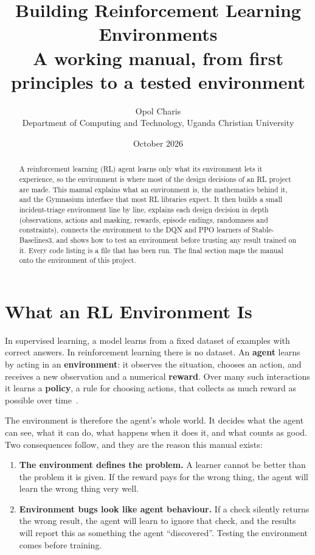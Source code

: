 \documentclass[11pt,a4paper]{article}
\title{\textbf{Building Reinforcement Learning Environments}\\[2pt]\large A working manual, from first principles to a tested environment}
\author{Opol Charis\\\small Department of Computing and Technology, Uganda Christian University}
\date{October 2026}
\begin{document}
\maketitle
\vspace{-6pt}

\begin{abstract}
\noindent A reinforcement learning (RL) agent learns only what its environment lets it experience, so the environment is where most of the design decisions of an RL project are made. This manual explains what an environment is, the mathematics behind it, and the Gymnasium interface that most RL libraries expect. It then builds a small incident-triage environment line by line, explains each design decision in depth (observations, actions and masking, rewards, episode endings, randomness and constraints), connects the environment to the DQN and PPO learners of Stable-Baselines3, and shows how to test an environment before trusting any result trained on it. Every code listing is a file that has been run. The final section maps the manual onto the environment of this project.
\end{abstract}

\tableofcontents
\vspace{4pt}

\section{What an RL Environment Is}

In supervised learning, a model learns from a fixed dataset of examples with correct answers. In reinforcement learning there is no dataset. An \textbf{agent} learns by acting in an \textbf{environment}: it observes the situation, chooses an action, and receives a new observation and a numerical \textbf{reward}. Over many such interactions it learns a \textbf{policy}, a rule for choosing actions, that collects as much reward as possible over time~\cite{sutton}.

The environment is therefore the agent's whole world. It decides what the agent can see, what it can do, what happens when it does it, and what counts as good. Two consequences follow, and they are the reason this manual exists:
\begin{enumerate}
  \item \textbf{The environment defines the problem.} A learner cannot be better than the problem it is given. If the reward pays for the wrong thing, the agent will learn the wrong thing very well.
  \item \textbf{Environment bugs look like agent behaviour.} If a check silently returns the wrong result, the agent will learn to ignore that check, and the results will report this as something the agent ``discovered''. Testing the environment comes before training.
\end{enumerate}
\end{document}
